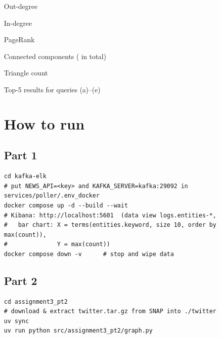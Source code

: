 \documentclass[11pt]{article}
\begin{document}
\begin{table}[H]\centering
  \begin{subtable}[t]{0.32\linewidth}\centering\caption{Out-degree}
  \end{subtable}\hfill
  \begin{subtable}[t]{0.32\linewidth}\centering\caption{In-degree}
  \end{subtable}\hfill
  \begin{subtable}[t]{0.32\linewidth}\centering\caption{PageRank}
  \end{subtable}

  \vspace{1em}
  \begin{subtable}[t]{0.45\linewidth}\centering\caption{Connected
    components (\nComponents{} in total)}
  \end{subtable}\hfill
  \begin{subtable}[t]{0.45\linewidth}\centering\caption{Triangle
    count}
  \end{subtable}
  \caption{Top-5 results for queries (a)--(e)}
  \label{tab:graph}
\end{table}

\section{How to run}
\subsection*{Part 1}
\begin{verbatim}
cd kafka-elk
# put NEWS_API=<key> and KAFKA_SERVER=kafka:29092 in services/poller/.env_docker
docker compose up -d --build --wait
# Kibana: http://localhost:5601  (data view logs.entities-*,
#   bar chart: X = terms(entities.keyword, size 10, order by max(count)),
#              Y = max(count))
docker compose down -v      # stop and wipe data
\end{verbatim}

\subsection*{Part 2}
\begin{verbatim}
cd assignment3_pt2
# download & extract twitter.tar.gz from SNAP into ./twitter
uv sync
uv run python src/assignment3_pt2/graph.py
\end{verbatim}
\end{document}
